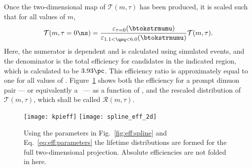 Once the two-dimensional map of $\mathcal{T}(m,\tau)$ has been produced, it is scaled such that
for all values of $m$,
\begin{equation}
  \mathcal{T}(m,\tau=0\ns) =
  \frac{
    \varepsilon_{\tau=0}(\btokstrmumu)
  }{
    \varepsilon_{1.1<\qsq<6.0}(\btokstrmumu)
  }
  \mathcal{T}(m,\tau).
\end{equation}
Here, the numerator is \qsq dependent and is calculated using
simulated events, and the denominator is the total
efficiency for candidates in the indicated \qsq region, which is calculated to be $3.93\pc$.
This efficiency ratio is approximately equal to one for all values of \mass{\db}.
Figure~\ref{fig:eff:effmap} shows both the efficiency for a prompt dimuon pair --- or equivalently
a \db\ --- as a function of \qsq, and the rescaled distribution of $\mathcal{T}(m,\tau)$, which
shall
be called $\mathcal{R}(m,\tau)$.

\begin{figure}
  \begin{center}
    \texttt{[image: kpieff]}
    \texttt{[image: spline\_eff\_2d]}
    \caption{
      Using the parameters in Fig.~\ref{fig:eff:spline} and Eq.~\protect\ref{eq:eff:parameters} the
      lifetime distributions are formed for the full two-dimensional projection.
      Absolute efficiencies are not folded in here.
    }
    \label{fig:eff:effmap}
  \end{center}
\end{figure}




